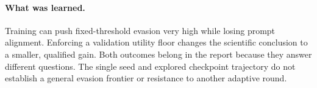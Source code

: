 \paragraph{What was learned.} Training can push fixed-threshold evasion very high while losing prompt alignment. Enforcing a validation utility floor changes the scientific conclusion to a smaller, qualified gain. Both outcomes belong in the report because they answer different questions. The single seed and explored checkpoint trajectory do not establish a general evasion frontier or resistance to another adaptive round.


